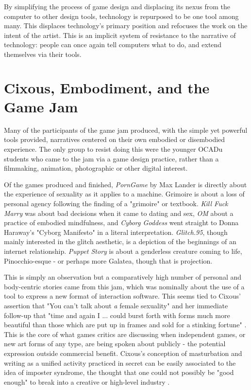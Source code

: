 By simplifying the process of game design and displacing its nexus from the computer to other design tools, technology is repurposed to be one tool among many. This displaces technology's primary position and refocuses the work on the intent of the artist. This is an implicit system of resistance to the narrative of technology: people can once again tell computers what to do, and extend themselves via their tools.

\section{Cixous, Embodiment, and the Game Jam}

Many of the participants of the game jam produced, with the simple yet powerful tools provided, narratives centered on their own embodied or disembodied experience. The only group to resist doing this were the younger OCADu students who came to the jam via a game design practice, rather than a filmmaking, animation, photographic or other digital interest.

Of the games produced and finished, \textit{PornGame} by Max Lander is directly about the experience of sexuality as it applies to a machine. Grimoire is about a loss of personal agency following the finding of a "grimoire" or textbook. \textit{Kill Fuck Marry} was about bad decisions when it came to dating and sex, \textit{OM} about a practice of embodied mindfulness, and \textit{Cyborg Goddess} went straight to Donna Haraway's "Cyborg Manifesto" in a literal interpretation. \textit{Glitch.95}, though mainly interested in the glitch aesthetic, is a depiction of the beginnings of an internet relationship. \textit{Puppet Story} is about a genderless creature coming to life, Pinocchio-esque - or perhaps more Galatea, though that is projection.

This is simply an observation but a comparatively high number of personal and body-centric stories came from this jam, which was nominally about the use of a tool to express a new format of interaction software. This seems tied to Cixous' assertion that "You can't talk about \textit{a} female sexuality" and her immediate follow-up that "time and again I ... could burst forth with forms much more beautiful than those which are put up in frames and sold for a stinking fortune" \parencite{cixous}. This is the core of what games critics are discussing when independent games, or new art forms of any type, are being spoken about publicly - the potential expression outside commercial benefit. Cixous's conception of masturbation and writing as a unified activity practiced in secret can be easily associated to the idea of imposter syndrome, the thought that one could not possibly be "good enough" to break into a creative or high-level industry \parencite{imposter}. 

